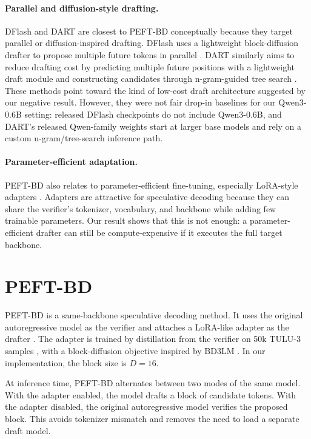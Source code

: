 \documentclass[11pt]{article}
\begin{document}
\paragraph{Parallel and diffusion-style drafting.}
DFlash and DART are closest to PEFT-BD conceptually because they target parallel or diffusion-inspired drafting. DFlash uses a lightweight block-diffusion drafter to propose multiple future tokens in parallel \citep{dflash}. DART similarly aims to reduce drafting cost by predicting multiple future positions with a lightweight draft module and constructing candidates through n-gram-guided tree search \citep{dart}. These methods point toward the kind of low-cost draft architecture suggested by our negative result. However, they were not fair drop-in baselines for our Qwen3-0.6B setting: released DFlash checkpoints do not include Qwen3-0.6B, and DART's released Qwen-family weights start at larger base models and rely on a custom n-gram/tree-search inference path.

\paragraph{Parameter-efficient adaptation.}
PEFT-BD also relates to parameter-efficient fine-tuning, especially LoRA-style adapters \citep{hu2022lora}. Adapters are attractive for speculative decoding because they can share the verifier's tokenizer, vocabulary, and backbone while adding few trainable parameters. Our result shows that this is not enough: a parameter-efficient drafter can still be compute-expensive if it executes the full target backbone.

\section{PEFT-BD}

PEFT-BD is a same-backbone speculative decoding method. It uses the original autoregressive model as the verifier and attaches a LoRA-like adapter as the drafter \citep{hu2022lora}. The adapter is trained by distillation from the verifier on 50k TULU-3 samples \citep{tulu}, with a block-diffusion objective inspired by BD3LM \citep{bd3lm}. In our implementation, the block size is $D=16$.

At inference time, PEFT-BD alternates between two modes of the same model. With the adapter enabled, the model drafts a block of candidate tokens. With the adapter disabled, the original autoregressive model verifies the proposed block. This avoids tokenizer mismatch and removes the need to load a separate draft model.
\end{document}
